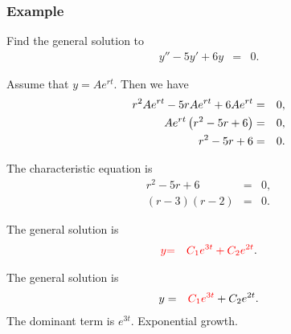 \begin{frame}
  \frametitle{Example}

  Find the general solution to
  \begin{eqnarray*}
    y'' - 5y' + 6y & = & 0.
  \end{eqnarray*}

  {
    Assume that $y=Ae^{rt}$. Then we have
    \begin{eqnarray*}
      r^2Ae^{rt} - 5r Ae^{rt} + 6 Ae^{rt} & = & 0, \\
      Ae^{rt} \left( r^2 - 5r + 6 \right) & = & 0, \\
      r^2 - 5r + 6 & = & 0.
    \end{eqnarray*}
  }

  {
    The characteristic equation is
    \begin{eqnarray*}
      r^2 - 5r + 6 & = & 0, \\
      (r-3)(r-2) & = & 0.
    \end{eqnarray*}

    The general solution is
    \begin{eqnarray*}
      {\color{red}y} & {\color{red}=} & {\color{red}C_1 e^{3t} + C_2 e^{2t}}.
    \end{eqnarray*}

  }


  {
    The general solution is
    \begin{eqnarray*}
      y & = & {\color{red}C_1 e^{3t}} + C_2 e^{2t}.
    \end{eqnarray*}
    The dominant term is $e^{3t}$. Exponential growth.
  }

\end{frame}


